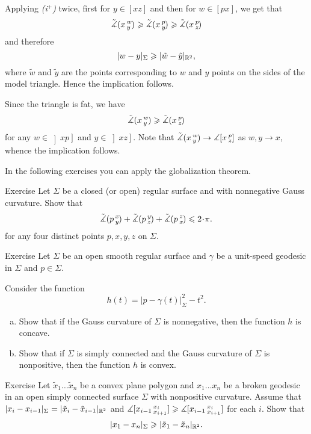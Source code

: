 Applying \textit{(i$^{+}$)} twice, first for $y\in [xz]$ and then for $w\in [px]$, we get that
\[\tilde\measuredangle(x\,{}^{w}_{y}\hspace{-0.2ex}) \geqslant \tilde\measuredangle(x\,{}^{p}_{y}\hspace{-0.2ex}) \geqslant \tilde\measuredangle(x\,{}^{p}_{z}\hspace{-0.2ex})\]
and therefore
\[|w-y|_\Sigma\geqslant |\tilde w-\tilde y|_{\mathbb{R}^2},\]
where $\tilde w$ and $\tilde y$ are the points corresponding to $w$ and $y$ points on the sides of the model triangle. Hence the implication follows.

Since the triangle is fat, we have 
\[\tilde\measuredangle(x\,{}^{w}_{y}\hspace{-0.2ex}) \geqslant \tilde\measuredangle(x\,{}^{p}_{z}\hspace{-0.2ex})\]
for any $w\in \left]xp\right]$ and $y\in \left]xz\right]$.
Note that $\tilde\measuredangle(x\,{}^{w}_{y}\hspace{-0.2ex})\to \measuredangle[x\,{}^{p}_{z}]$ as $w,y\to x$, whence the implication follows.
\qeds

In the following exercises you can apply the globalization theorem.

\begin{thm}{Exercise}\label{ex:sum=<2pi}
Let $\Sigma$ be a closed (or open) regular surface and with nonnegative Gauss curvature.
Show that 
\[\angk pxy+\angk pyz+\angk pzx\le2\cdot \pi.\]
for any four distinct points $p,x,y,z$ on $\Sigma$.
\end{thm}

\begin{thm}{Exercise}\label{ex:geod-convexity}
Let $\Sigma$ be an open smooth regular surface
and $\gamma$ be a unit-speed geodesic in $\Sigma$ and $p\in\Sigma$.

Consider the function
\[h(t)=|p-\gamma(t)|_\Sigma^2-t^2.\]

\begin{enumerate}[(a)]
\item Show that if the Gauss curvature of $\Sigma$ is nonnegative, then the function $h$ is concave.
\item Show that if $\Sigma$ is simply connected and the Gauss curvature of $\Sigma$ is nonpositive, then the function $h$ is convex.
\end{enumerate}
\end{thm}

\begin{thm}{Exercise}\label{ex:arm-lemma}
Let $\tilde x_1\dots\tilde x_n$ be a convex plane polygon and
$x_1\dots x_n$ be a broken geodesic in an open simply connected surface $\Sigma$ with nonpositive curvature.
Assume that
$|x_i-x_{i-1}|_\Sigma=|\tilde x_i-\tilde x_{i-1}|_{\mathbb{R}^2}$ and
$\measuredangle[x_{i-1}\,{}^{x_i}_{x_{i+1}}]\geqslant \measuredangle[x_{i-1}\,{}^{x_i}_{x_{i+1}}]$
 for each $i$.
Show that \[|x_1-x_n|_\Sigma\ge |\tilde x_1\z-\tilde x_n|_{\RR^2}.\]
\end{thm}

